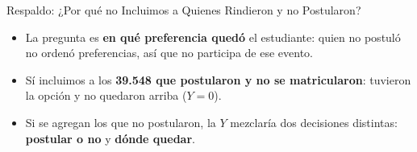 \documentclass[10pt, aspectratio=169, xcolor=table]{beamer}
\begin{document}
\begin{frame}[noframenumbering]{Respaldo: ¿Por qué no Incluimos a Quienes Rindieron y no Postularon?}
  \begin{itemize}
    \item La pregunta es \textbf{en qué preferencia quedó} el estudiante: quien no postuló no ordenó preferencias, así que no participa de ese evento.
    \item Sí incluimos a los \textbf{39.548 que postularon y no se matricularon}: tuvieron la opción y no quedaron arriba ($Y = 0$).
    \item Si se agregan los que no postularon, la $Y$ mezclaría dos decisiones distintas: \textbf{\textcolor{USACHOrange}{postular o no}} y \textbf{\textcolor{USACHOrange}{dónde quedar}}.
  \end{itemize}
\end{frame}
\end{document}

